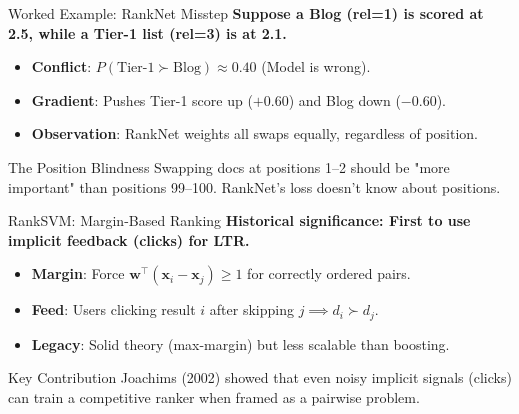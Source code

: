 \documentclass[aspectratio=169]{beamer}
\newif\ifanimated
\newcommand{\cpause}{\ifanimated\pause\fi}
\begin{document}
\begin{frame}[shrink=5]{Worked Example: RankNet Misstep}
\textbf{Suppose a Blog (rel=1) is scored at 2.5, while a Tier-1 list (rel=3) is at 2.1.}

\vspace{0.8em}
\begin{itemize}
    \item \textbf{Conflict}: $P(\text{Tier-1} \succ \text{Blog}) \approx 0.40$ (Model is wrong).
    \item \textbf{Gradient}: Pushes Tier-1 score up ($+0.60$) and Blog down ($-0.60$).
    \item \textbf{Observation}: RankNet weights all swaps equally, regardless of position.
\end{itemize}

\vspace{1em}
\cpause
\begin{alertblock}{The Position Blindness}
Swapping docs at positions 1--2 should be "more important" than positions 99--100. RankNet's loss doesn't know about positions.
\end{alertblock}
\end{frame}

\begin{frame}{RankSVM: Margin-Based Ranking}
\textbf{Historical significance: First to use implicit feedback (clicks) for LTR.}

\vspace{0.8em}
\begin{itemize}
    \item \textbf{Margin}: Force $\mathbf{w}^\top (\mathbf{x}_i - \mathbf{x}_j) \geq 1$ for correctly ordered pairs.
    \item \textbf{Feed}: Users clicking result $i$ after skipping $j \implies d_i \succ d_j$.
    \item \textbf{Legacy}: Solid theory (max-margin) but less scalable than boosting.
\end{itemize}

\vspace{1em}
\begin{exampleblock}{Key Contribution}
Joachims (2002) showed that even noisy implicit signals (clicks) can train a competitive ranker when framed as a pairwise problem.
\end{exampleblock}
\end{frame}

\end{document}
